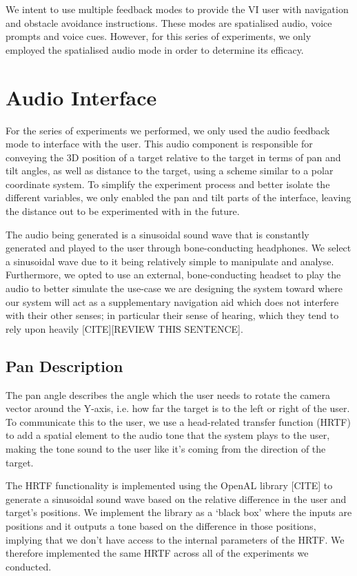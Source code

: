 \documentclass[format=sigconf, review=true, screen=true, anonymous=true]{acmart}
\begin{document}
We intent to use multiple feedback modes to provide the VI user with navigation and obstacle avoidance instructions. These modes are spatialised audio, voice prompts and voice cues. However, for this series of experiments, we only employed the spatialised audio mode in order to determine its efficacy. 

\section{Audio Interface}

For the series of experiments we performed, we only used the audio feedback mode to interface with the user. This audio component is responsible for conveying the 3D position of a target relative to the target in terms of pan and tilt angles, as well as distance to the target, using a scheme similar to a polar coordinate system. To simplify the experiment process and better isolate the different variables, we only enabled the pan and tilt parts of the interface, leaving the distance out to be experimented with in the future.  

The audio being generated is a sinusoidal sound wave that is constantly generated and played to the user through bone-conducting headphones. We select a sinusoidal wave due to it being relatively simple to manipulate and analyse. Furthermore, we opted to use an external, bone-conducting headset to play the audio to better simulate the use-case we are designing the system toward where our system will act as a supplementary navigation aid which does not interfere with their other senses; in particular their sense of hearing, which they tend to rely upon heavily [CITE][REVIEW THIS SENTENCE].

\subsection{Pan Description}

The pan angle describes the angle which the user needs to rotate the camera vector around the Y-axis, i.e. how far the target is to the left or right of the user. To communicate this to the user, we use a head-related transfer function (HRTF) to add a spatial element to the audio tone that the system plays to the user, making the tone sound to the user like it's coming from the direction of the target. 

The HRTF functionality is implemented using the OpenAL library [CITE] to generate a sinusoidal sound wave based on the relative difference in the user and target's positions. We implement the library as a `black box' where the inputs are positions and it outputs a tone based on the difference in those positions, implying that we don't have access to the internal parameters of the HRTF. We therefore implemented the same HRTF across all of the experiments we conducted.  
\end{document}

